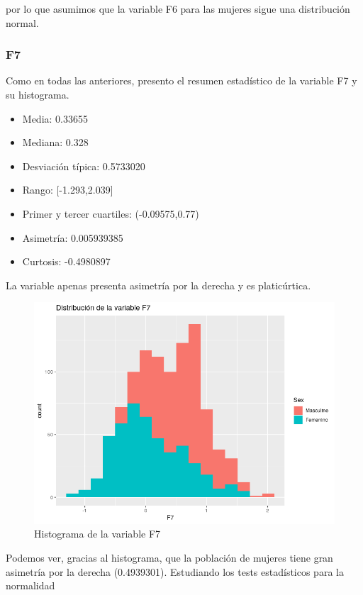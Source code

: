 por lo que asumimos que la variable F6 para las mujeres sigue una distribución normal.

\subsubsection{F7}

Como en todas las anteriores, presento el resumen estadístico de la variable F7 y su histograma.

\begin{itemize}
	\item Media: 0.33655
	\item Mediana: 0.328
	\item Desviación típica: 0.5733020
	\item Rango: [-1.293,2.039]
	\item Primer y tercer cuartiles: (-0.09575,0.77)
	\item Asimetría: 0.005939385
	\item Curtosis: -0.4980897
\end{itemize}


La variable apenas presenta asimetría por la derecha y es platicúrtica.

\begin{figure}[H] %
	\centering
	\includegraphics[scale=0.6]{dist-F7.png}  %
	\caption{Histograma de la variable F7} 
	\label{fig:hist-F7}
\end{figure}

Podemos ver, gracias al histograma, que la población de mujeres tiene gran asimetría por la derecha (0.4939301). Estudiando los tests estadísticos para la normalidad

